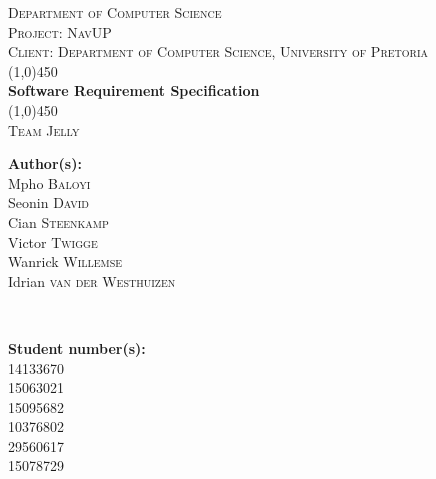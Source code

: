 \documentclass[a4paper,12pt]{article}
\begin{document}
\begin{titlepage}
\center


\textsc{\LARGE Department of Computer Science} \\ [.5cm]
\textsc{\Large Project: NavUP} \\ [.5cm]
\textsc{\Large Client: Department of Computer Science, University of Pretoria} \\ [.5cm]
\line(1,0){450}\\[.5cm]
\huge{\bfseries Software Requirement Specification}\\
\line(1,0){450}\\[.5cm]
\textsc{\LARGE Team Jelly}\\ [0.5cm]

\begin{minipage}{0.4\textwidth}
\begin{flushleft} \large
\textbf{Author(s):}\\
Mpho \textsc{Baloyi}\\
Seonin  \textsc{David}\\
Cian  \textsc{Steenkamp}\\
Victor \textsc{Twigge}\\
Wanrick  \textsc{Willemse}\\
Idrian  \textsc{van der Westhuizen}\\
\end{flushleft}
\end{minipage}
~
\begin{minipage}{0.4\textwidth}
\begin{flushright} \large
\textbf{Student number(s):} \\
14133670\\
15063021\\
15095682\\
10376802\\
29560617\\
15078729\\
\end{flushright}
\end{minipage}\\




\vfil

\end{titlepage}
\newpage
\tableofcontents
\newpage
\end{document}
